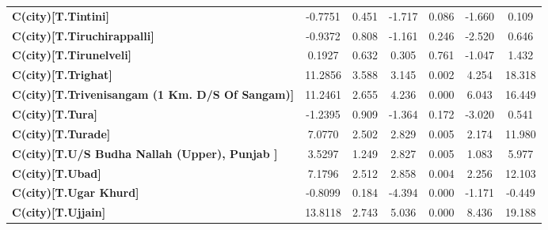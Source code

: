 \begin{center}
\begin{tabular}{lcccccc}
\textbf{C(city)[T.Tintini]}                                                                         &      -0.7751  &        0.451     &    -1.717  &         0.086        &       -1.660    &        0.109     \\
\textbf{C(city)[T.Tiruchirappalli]}                                                                 &      -0.9372  &        0.808     &    -1.161  &         0.246        &       -2.520    &        0.646     \\
\textbf{C(city)[T.Tirunelveli]}                                                                     &       0.1927  &        0.632     &     0.305  &         0.761        &       -1.047    &        1.432     \\
\textbf{C(city)[T.Trighat]}                                                                         &      11.2856  &        3.588     &     3.145  &         0.002        &        4.254    &       18.318     \\
\textbf{C(city)[T.Trivenisangam (1 Km. D/S Of Sangam)]}                                             &      11.2461  &        2.655     &     4.236  &         0.000        &        6.043    &       16.449     \\
\textbf{C(city)[T.Tura]}                                                                            &      -1.2395  &        0.909     &    -1.364  &         0.172        &       -3.020    &        0.541     \\
\textbf{C(city)[T.Turade]}                                                                          &       7.0770  &        2.502     &     2.829  &         0.005        &        2.174    &       11.980     \\
\textbf{C(city)[T.U/S Budha Nallah (Upper), Punjab      ]}                                          &       3.5297  &        1.249     &     2.827  &         0.005        &        1.083    &        5.977     \\
\textbf{C(city)[T.Ubad]}                                                                            &       7.1796  &        2.512     &     2.858  &         0.004        &        2.256    &       12.103     \\
\textbf{C(city)[T.Ugar Khurd]}                                                                      &      -0.8099  &        0.184     &    -4.394  &         0.000        &       -1.171    &       -0.449     \\
\textbf{C(city)[T.Ujjain]}                                                                          &      13.8118  &        2.743     &     5.036  &         0.000        &        8.436    &       19.188     \\

\end{tabular}
\end{center}
